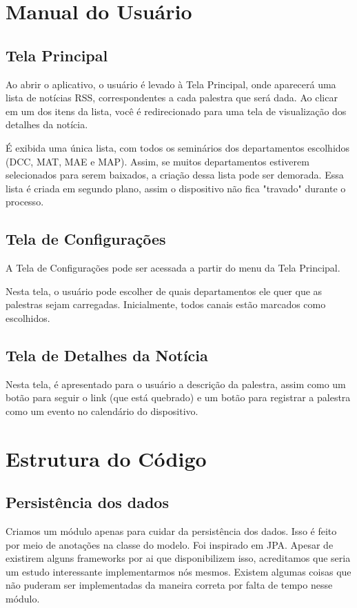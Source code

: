 




\cabecalho

\section{Manual do Usuário}
\subsection{Tela Principal}
Ao abrir o aplicativo, o usuário é levado à Tela Principal, onde aparecerá uma lista de notícias RSS, correspondentes a cada palestra que será dada. Ao clicar em um dos itens da lista, você é redirecionado para uma tela de visualização dos detalhes da notícia.

É exibida uma única lista, com todos os seminários dos departamentos escolhidos (DCC, MAT, MAE e MAP). Assim, se muitos departamentos estiverem selecionados para serem baixados, a criação dessa lista pode ser demorada. Essa lista é criada em segundo plano, assim o dispositivo não fica "travado" durante o processo.

\subsection{Tela de Configurações}
A Tela de Configurações pode ser acessada a partir do menu da Tela Principal.

Nesta tela, o usuário pode escolher de quais departamentos ele quer que as palestras sejam carregadas.
Inicialmente, todos canais estão marcados como escolhidos.

\subsection{Tela de Detalhes da Notícia}
Nesta tela, é apresentado para o usuário a descrição da palestra, assim como um botão para seguir o link (que está quebrado) e um botão para registrar a palestra como um evento no calendário do dispositivo.


\section{Estrutura do Código}
\subsection{Persistência dos dados}
Criamos um módulo apenas para cuidar da persistência dos dados. Isso é feito por meio de anotações na classe do modelo. Foi inspirado em JPA. Apesar de existirem alguns frameworks por ai que disponibilizem isso, acreditamos que seria um estudo interessante implementarmos nós mesmos. Existem algumas coisas que não puderam ser implementadas da maneira correta por falta de tempo nesse módulo.

